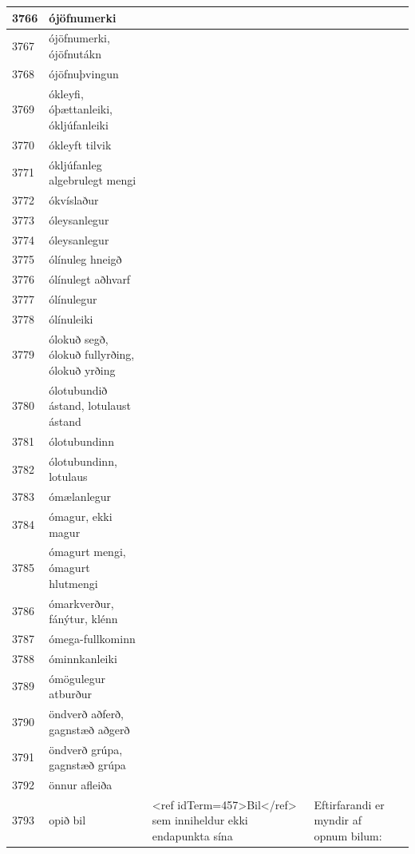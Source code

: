 \begin{longtable}{p{}|p{}|p{}|p{}|p{}}
\hline
3766 & ójöfnumerki &  &  &  \\
\hline
3767 & ójöfnumerki, ójöfnutákn &  &  &  \\
\hline
3768 & ójöfnuþvingun &  &  &  \\
\hline
3769 & ókleyfi, óþættanleiki, ókljúfanleiki &  &  &  \\
\hline
3770 & ókleyft tilvik &  &  &  \\
\hline
3771 & ókljúfanleg algebrulegt mengi &  &  &  \\
\hline
3772 & ókvíslaður &  &  &  \\
\hline
3773 & óleysanlegur &  &  &  \\
\hline
3774 & óleysanlegur &  &  &  \\
\hline
3775 & ólínuleg hneigð &  &  &  \\
\hline
3776 & ólínulegt aðhvarf &  &  &  \\
\hline
3777 & ólínulegur &  &  &  \\
\hline
3778 & ólínuleiki &  &  &  \\
\hline
3779 & ólokuð segð, ólokuð fullyrðing, ólokuð yrðing &  &  &  \\
\hline
3780 & ólotubundið ástand, lotulaust ástand &  &  &  \\
\hline
3781 & ólotubundinn &  &  &  \\
\hline
3782 & ólotubundinn, lotulaus &  &  &  \\
\hline
3783 & ómælanlegur &  &  &  \\
\hline
3784 & ómagur, ekki magur &  &  &  \\
\hline
3785 & ómagurt mengi, ómagurt hlutmengi &  &  &  \\
\hline
3786 & ómarkverður, fánýtur, klénn &  &  &  \\
\hline
3787 & ómega-fullkominn &  &  &  \\
\hline
3788 & óminnkanleiki &  &  &  \\
\hline
3789 & ómögulegur atburður &  &  &  \\
\hline
3790 & öndverð aðferð, gagnstæð aðgerð &  &  &  \\
\hline
3791 & öndverð grúpa, gagnstæð grúpa &  &  &  \\
\hline
3792 & önnur afleiða &  &  &  \\
\hline
3793 & opið bil & <ref idTerm=457>Bil</ref> sem inniheldur ekki endapunkta sína & Eftirfarandi er myndir af opnum bilum:


\end{longtable}
